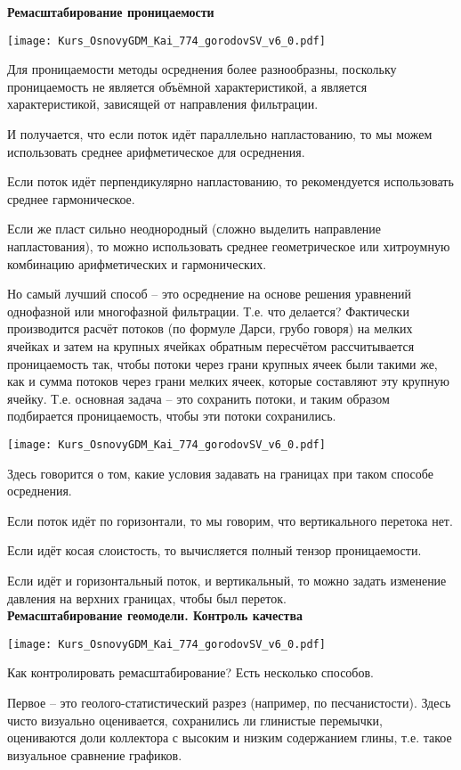 \documentclass[main.tex]{subfiles}
\begin{document}
\textbf{Ремасштабирование проницаемости}

\texttt{[image: Kurs\_OsnovyGDM\_Kai\_774\_gorodovSV\_v6\_0.pdf]}

Для проницаемости методы осреднения более разнообразны, поскольку проницаемость не является объёмной характеристикой, а является характеристикой, зависящей от направления фильтрации.

И получается, что если поток идёт параллельно напластованию, то мы можем использовать среднее арифметическое для осреднения.

Если поток идёт перпендикулярно напластованию, то рекомендуется использовать среднее гармоническое.

Если же пласт сильно неоднородный (сложно выделить направление напластования), то можно использовать среднее геометрическое или хитроумную комбинацию арифметических и гармонических.

Но самый лучший способ -- это осреднение на основе решения уравнений однофазной или многофазной фильтрации.
Т.е. что делается?
Фактически производится расчёт потоков (по формуле Дарси, грубо говоря) на мелких ячейках и затем на крупных ячейках обратным пересчётом рассчитывается проницаемость так, чтобы потоки через грани крупных ячеек были такими же, как и сумма потоков через грани мелких ячеек, которые составляют эту крупную ячейку. Т.е. основная задача -- это сохранить потоки, и таким образом подбирается проницаемость, чтобы эти потоки сохранились.

\texttt{[image: Kurs\_OsnovyGDM\_Kai\_774\_gorodovSV\_v6\_0.pdf]}

Здесь говорится о том, какие условия задавать на границах при таком способе осреднения.

Если поток идёт по горизонтали, то мы говорим, что вертикального перетока нет.

Если идёт косая слоистость, то вычисляется полный тензор проницаемости.

Если идёт и горизонтальный поток, и вертикальный, то можно задать изменение давления на верхних границах, чтобы был переток.
\\

\textbf{Ремасштабирование геомодели. Контроль качества}

\texttt{[image: Kurs\_OsnovyGDM\_Kai\_774\_gorodovSV\_v6\_0.pdf]}

Как контролировать ремасштабирование?
Есть несколько способов.

Первое -- это геолого-статистический разрез (например, по песчанистости).
Здесь чисто визуально оценивается, сохранились ли глинистые перемычки, оцениваются доли коллектора с высоким и низким содержанием глины, т.е. такое визуальное сравнение графиков.
\end{document}
